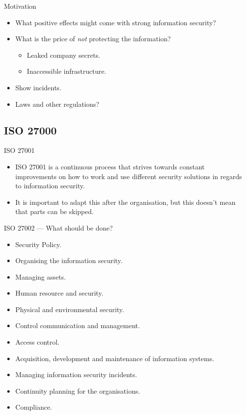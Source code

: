 \documentclass{beamer}
\begin{document}
\begin{frame}{Motivation}
  \begin{itemize}
    \item What positive effects might come with strong information security?
    \item What is the price of \emph{not} protecting the information?
      \begin{itemize}
        \item Leaked company secrets.
        \item Inaccessible infrastructure.
      \end{itemize}
    \item Show incidents.
    \item Laws and other regulations?
  \end{itemize}
\end{frame}

\subsection{ISO 27000}
\begin{frame}{ISO 27001}
  \begin{itemize}
    \item ISO 27001 is a continuous process that strives towards constant
      improvements on how to work and use different security solutions in
      regards to information security.
    \item It is important to adapt this after the organisation, but this doesn't
      mean that parts can be skipped.
  \end{itemize}
\end{frame}

\begin{frame}{ISO 27002 --- What should be done?}
  \begin{itemize}
    \item Security Policy.
    \item Organising the information security.
    \item Managing assets.
    \item Human resource and security.
    \item Physical and environmental security.
    \item Control communication and management.
    \item Access control.
    \item Acquisition, development and maintenance of information systems.
    \item Managing information security incidents.
    \item Continuity planning for the organisations.
    \item Compliance.
  \end{itemize}
\end{frame}
\end{document}

